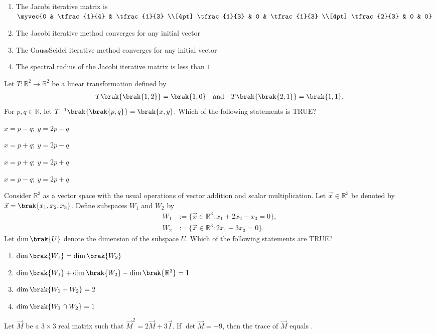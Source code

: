 \hfill{}

\begin{enumerate}
\item The Jacobi iterative matrix is ~$\myvec{0 & \tfrac{1}{4} & \tfrac{1}{3} \\[4pt]
\tfrac{1}{3} & 0 & \tfrac{1}{3} \\[4pt]
\tfrac{2}{3} & 0 & 0}$
\item The Jacobi iterative method converges for any initial vector
\item The Gauss\textendash Seidel iterative method converges for any initial vector
\item The spectral radius of the Jacobi iterative matrix is less than $1$
\end{enumerate}
\item Let $T \colon \mathbb{R}^{2} \to \mathbb{R}^{2}$ be a linear transformation defined by
\begin{align*}
T\brak{\brak{1,2}} = \brak{1,0} \quad \text{and} \quad T\brak{\brak{2,1}} = \brak{1,1}.
\end{align*}
For $p,q \in \mathbb{R}$, let $T^{-1}\brak{\brak{p,q}} = \brak{x,y}$. Which of the following statements is TRUE?
\hfill{}
\begin{enumerate}
\begin{multicols}{2}
\item $x = p - q;\ y = 2p - q$
\item $x = p + q;\ y = 2p - q$
\item $x = p + q;\ y = 2p + q$
\item $x = p - q;\ y = 2p + q$
\end{multicols}
\end{enumerate}
\item Consider $\mathbb{R}^3$ as a vector space with the usual operations of vector addition and scalar multiplication. Let $\vec{x} \in \mathbb{R}^3$ be denoted by $\vec{x} = \brak{x_1, x_2, x_3}$. Define subspaces $W_1$ and $W_2$ by
\begin{align*}
W_1 &:= \{ \vec{x} \in \mathbb{R}^3 \colon x_1 + 2x_2 - x_3 = 0 \},\\
W_2 &:= \{ \vec{x} \in \mathbb{R}^3 \colon 2x_1 + 3x_3 = 0 \}.
\end{align*}
Let $\dim\brak{U}$ denote the dimension of the subspace $U$. Which of the following statements are TRUE?
\hfill{}
\begin{enumerate}
\item $\dim\brak{W_1} = \dim\brak{W_2}$
\item $\dim\brak{W_1} + \dim\brak{W_2} - \dim\brak{\mathbb{R}^3} = 1$
\item $\dim\brak{W_1 + W_2} = 2$
\item $\dim\brak{W_1 \cap W_2} = 1$
\end{enumerate}
\item Let $\vec{M}$ be a $3 \times 3$ real matrix such that $\vec{M}^2 = 2\vec{M} + 3\vec{I}$. If $\det \vec{M} = -9$, then the trace of $\vec{M}$ equals \underline{\hspace{2cm}}.
\hfill{}
